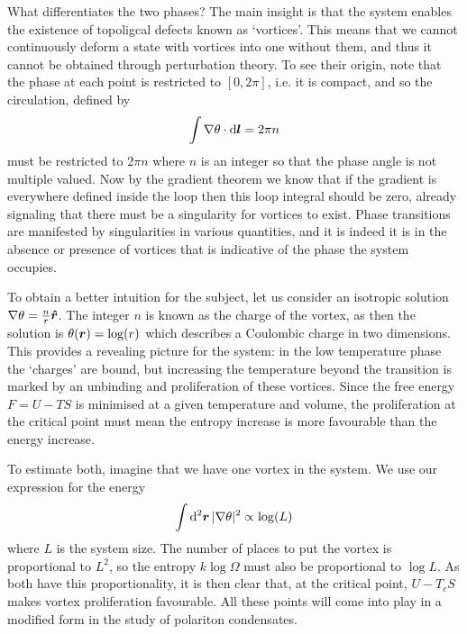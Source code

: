 What differentiates the two phases? The main insight is that the system enables the existence of topoligcal defects known as `vortices'. This means that we cannot continuously deform a state with vortices into one without them, and thus it cannot be obtained through perturbation theory. To see their origin, note that the phase at each point is restricted to $[0, 2\pi]$,  i.e. it is compact, and so the circulation, defined by 
\[
\int \nabla \theta \cdot \dd{\boldsymbol{l}} = 2\pi n
\]
must be restricted to $2 \pi n$ where $n$ is an integer so that the phase angle is not multiple valued. Now by the gradient theorem we know that if the gradient is everywhere defined inside the loop then this loop integral should be zero, already signaling that there must be a singularity for vortices to exist. Phase transitions are manifested by singularities in various quantities, and it is indeed it is in the absence or presence of vortices that is indicative of the phase the system occupies. 

To obtain a better intuition for the subject, let us consider an isotropic solution $\nabla \theta = \frac{n}{r} \boldsymbol{\hat{r}}$. The integer $n$ is known as the charge of the vortex, as then the solution is $\theta(\boldsymbol{r}) = \log(r)$ which describes a Coulombic charge in two dimensions. This provides a revealing picture for the system: in the low temperature phase the `charges' are bound, but increasing the temperature beyond the transition is marked by an unbinding and proliferation of these vortices. Since the free energy $F = U - TS$ is minimised at a given temperature and volume, the proliferation at the critical point must mean the entropy increase is more favourable than the energy increase. 

To estimate both, imagine that we have one vortex in the system. We use our expression for the energy
\[
\int \dd[2]{\boldsymbol{r}} | \nabla \theta |^2 \propto \log(L)
\]
where $L$ is the system size. The number of places to put the vortex is proportional to $L^2$, so the entropy $k \log \Omega$ must also be proportional to $\log L$. As both have this proportionality, it is then clear that, at the critical point, $U - T_cS$ makes vortex proliferation favourable. All these points will come into play in a modified form in the study of polariton condensates.


